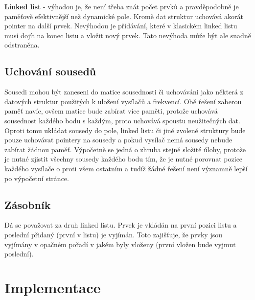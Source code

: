 \documentclass[12pt]{article}
\begin{document}
\textbf{Linked list} - výhodou je, že není třeba znát počet prvků a 
pravděpodobně je paměťově efektivnější než dynamické pole. Kromě dat struktur 
uchovává akorát pointer na další prvek. Nevýhodou je přídávání, které v 
klasickém linked listu musí dojít na konec listu a vložit nový prvek. Tato 
nevýhoda může být ale snadně odstraněna.
%
\subsection{Uchování sousedů}
%
Sousedi mohou být zaneseni do matice sousednosti či uchováváni jako některá z 
datových struktur použitých k uložení vysílačů a frekvencí. Obě řešení 
zaberou paměť navíc, ovšem matice bude zabírat více paměti, protože uchovává 
sousednost každého bodu s každým, proto uchovává spoustu neužitečných dat. 
Oproti tomu ukládat sousedy do pole, linked listu či jiné zvolené struktury 
bude pouze uchovávat pointery na sousedy a pokud vysílač nemá sousedy nebude 
zabírat žádnou paměť. Výpočetně se jedná o zhruba stejně složité úlohy, protože
je nutné zjistit všechny sousedy každého bodu tím, že je nutné porovnat pozice
každého vysílače o proti všem ostatním a tudíž žádné řešení není významně lepší
po výpočetní stránce.
%
\subsection{Zásobník}
%
Dá se považovat za druh linked listu. Prvek je vkládán na první pozici listu a 
poslední přidaný (první v listu) je vyjímán. Toto zajišťuje, že prvky jsou 
vyjímány v opačném pořadí v jakém byly vloženy (první vložen bude vyjmut 
poslední).
%
%
\section{Implementace}
%
\end{document}
